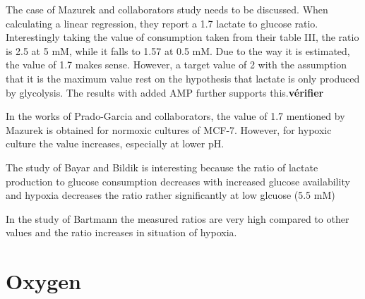 \documentclass[11pt,a4paper]{article}
\begin{document}
The case of Mazurek and collaborators study needs to be discussed. When calculating a linear regression, they report a 1.7 lactate to glucose ratio. Interestingly taking the value of consumption taken from their table III, the ratio is 2.5 at 5 mM, while it falls to 1.57 at 0.5 mM. Due to the way it is estimated, the value of 1.7 makes sense. However, a target value of 2 with the assumption that it is the maximum value rest on the hypothesis that lactate is only produced by glycolysis. The results with added AMP further supports this.\textbf{vérifier}

In the works of Prado-Garcia and collaborators, the value of 1.7 mentioned by Mazurek is obtained for normoxic cultures of MCF-7. However, for hypoxic culture the value increases, especially at lower pH.

The study of Bayar and Bildik is interesting because the ratio of lactate production to glucose consumption decreases with increased glucose availability and hypoxia decreases the ratio rather significantly at low glcuose (5.5 mM)

In the study of Bartmann the measured ratios are very high compared to other values and the ratio increases in situation of hypoxia. 


\section{Oxygen}

\newpage


\end{document}
